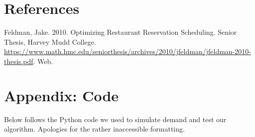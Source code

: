 \documentclass[12pt, titlepage]{article}
\begin{document}
\section{References}

Feldman, Jake. 2010. Optimizing Restaurant Reservation Scheduling. Senior Thesis, Harvey Mudd College. \href{https://www.math.hmc.edu/seniorthesis/archives/2010/jfeldman/jfeldman-2010-thesis.pdf}{https://www.math.hmc.edu/seniorthesis/archives/2010/jfeldman/jfeldman-2010-thesis.pdf}. Web.

\section{Appendix: Code}

Below follows the Python code we used to simulate demand and test our algorithm. Apologies for the rather inaccessible formatting.
\end{document}
